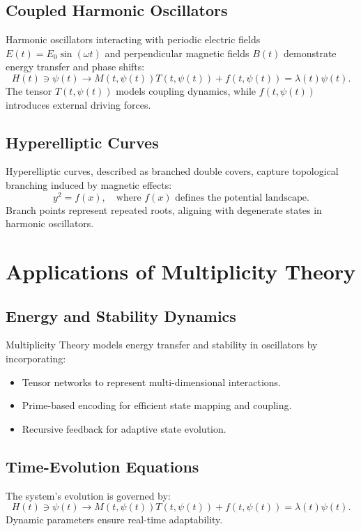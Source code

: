 \documentclass{article}
\theoremstyle{plain}
\begin{document}
\subsection{Coupled Harmonic Oscillators}
Harmonic oscillators interacting with periodic electric fields $E(t) = E_0 \sin(\omega t)$ and perpendicular magnetic fields $B(t)$ demonstrate energy transfer and phase shifts:\newline
\begin{equation}
H(t) \ni \psi(t) \rightarrow M(t,\psi(t)) T(t,\psi(t)) + f(t,\psi(t)) = \lambda(t) \psi(t).
\end{equation}
The tensor $T(t,\psi(t))$ models coupling dynamics, while $f(t,\psi(t))$ introduces external driving forces.

\subsection{Hyperelliptic Curves}
Hyperelliptic curves, described as branched double covers, capture topological branching induced by magnetic effects:\newline
\begin{equation}
y^2 = f(x), \quad \text{where } f(x) \text{ defines the potential landscape.}
\end{equation}
Branch points represent repeated roots, aligning with degenerate states in harmonic oscillators.

\section{Applications of Multiplicity Theory}

\subsection{Energy and Stability Dynamics}
Multiplicity Theory models energy transfer and stability in oscillators by incorporating:\newline
\begin{itemize}
    \item Tensor networks to represent multi-dimensional interactions.
    \item Prime-based encoding for efficient state mapping and coupling.
    \item Recursive feedback for adaptive state evolution.
\end{itemize}

\subsection{Time-Evolution Equations}
The system's evolution is governed by:
\begin{equation}
H(t) \ni \psi(t) \rightarrow M(t,\psi(t)) T(t,\psi(t)) + f(t,\psi(t)) = \lambda(t) \psi(t).
\end{equation}
Dynamic parameters ensure real-time adaptability.
\end{document}
